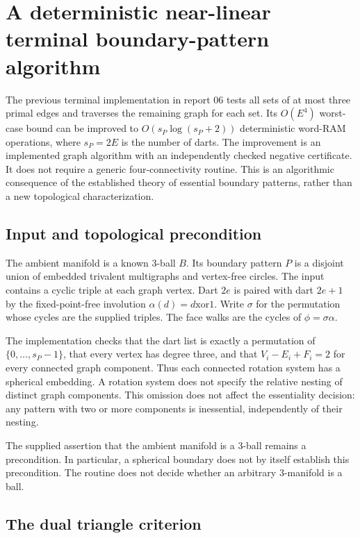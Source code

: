 \section{A deterministic near-linear terminal boundary-pattern algorithm}
\label{sec:terminal-patterns-new}

The previous terminal implementation in report 06 tests all sets of at most
three primal edges and traverses the remaining graph for each set.  Its
$O(E^4)$ worst-case bound can be improved to $O(s_P\log(s_P+2))$ deterministic
word-RAM operations, where $s_P=2E$ is the number of darts.  The improvement is
an implemented graph algorithm with an independently checked negative
certificate.  It does not require a generic four-connectivity routine.
This is an algorithmic consequence of the established theory of essential
boundary patterns, rather than a new topological characterization.

\subsection{Input and topological precondition}

The ambient manifold is a known 3-ball $B$.  Its boundary pattern $P$ is a
disjoint union of embedded trivalent multigraphs and vertex-free circles.
The input contains a cyclic triple at each graph vertex.  Dart $2e$ is
paired with dart $2e+1$ by the fixed-point-free involution
$\alpha(d)=d\mathbin{\mathrm{xor}}1$.  Write $\sigma$ for the permutation
whose cycles are the supplied triples.  The face walks are the cycles of
$\phi=\sigma\alpha$.

The implementation checks that the dart list is exactly a permutation of
$\{0,\ldots,s_P-1\}$, that every vertex has degree three, and that
$V_i-E_i+F_i=2$ for every connected graph component.  Thus each connected
rotation system has a spherical embedding.  A rotation system does not
specify the relative nesting of distinct graph components.  This omission
does not affect the essentiality decision: any pattern with two or more
components is inessential, independently of their nesting.

The supplied assertion that the ambient manifold is a 3-ball remains a
precondition.  In particular, a spherical boundary does not by itself
establish this precondition.  The routine does not decide whether an
arbitrary 3-manifold is a ball.

\subsection{The dual triangle criterion}

